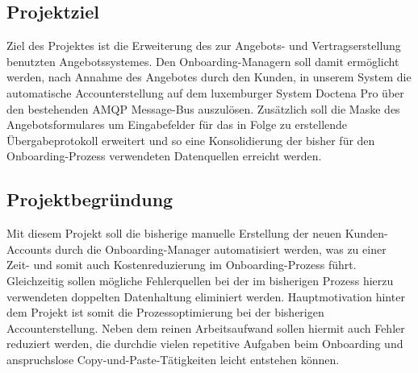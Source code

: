 \subsection{Projektziel} 
\label{sec:Projektziel}
Ziel des Projektes ist die Erweiterung des zur Angebots- und Vertragserstellung benutzten Angebotssystemes. Den Onboarding-Managern soll damit ermöglicht werden, nach Annahme des Angebotes durch den Kunden, in unserem System die automatische Accounterstellung auf dem luxemburger System Doctena Pro über den bestehenden \ac{AMQP} Message-Bus auszulösen. Zusätzlich soll die Maske des Angebotsformulares um Eingabefelder für das in Folge zu erstellende Übergabeprotokoll erweitert und so eine Konsolidierung der bisher für den Onboarding-Prozess verwendeten Datenquellen erreicht werden.

\subsection{Projektbegründung} 
\label{sec:Projektbegruendung}
Mit diesem Projekt soll die bisherige manuelle Erstellung der neuen Kunden-Accounts durch die Onboarding-Manager automatisiert werden, was zu einer Zeit- und somit auch Kostenreduzierung im Onboarding-Prozess führt. Gleichzeitig sollen mögliche Fehlerquellen bei der im bisherigen Prozess hierzu verwendeten doppelten Datenhaltung eliminiert werden.
Hauptmotivation hinter dem Projekt ist somit die Prozessoptimierung bei der bisherigen Accounterstellung. Neben dem reinen Arbeitsaufwand sollen hiermit auch Fehler reduziert werden, die durchdie vielen repetitive Aufgaben beim Onboarding und anspruchslose Copy-und-Paste-Tätigkeiten leicht entstehen können.

